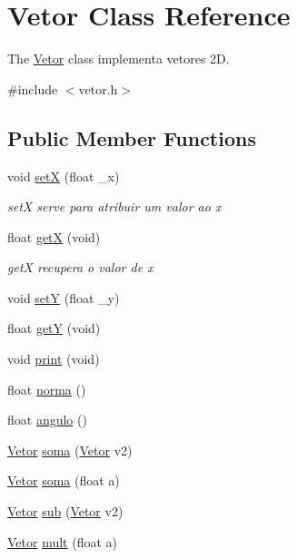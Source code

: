 \hypertarget{class_vetor}{}\section{Vetor Class Reference}
\label{class_vetor}


The \hyperlink{class_vetor}{Vetor} class implementa vetores 2D.  




{\ttfamily \#include $<$vetor.\+h$>$}

\subsection*{Public Member Functions}
\begin{DoxyCompactItemize}
\item 
void \hyperlink{class_vetor_a45e972d26987116ae8c89fefb09f5737}{setX} (float \+\_\+x)
\begin{DoxyCompactList}\small\item\em setX serve para atribuir um valor ao x \end{DoxyCompactList}\item 
float \hyperlink{class_vetor_a0b43068a518a1b9e42a2031aa6c41f0d}{getX} (void)
\begin{DoxyCompactList}\small\item\em getX recupera o valor de x \end{DoxyCompactList}\item 
void \hyperlink{class_vetor_a25c01341d46beebd3f4bf054d576772e}{setY} (float \+\_\+y)
\item 
float \hyperlink{class_vetor_aec52a87477cfeb998a1668abae852373}{getY} (void)
\item 
void \hyperlink{class_vetor_a253a700dc67db860e2ae8247f114990e}{print} (void)
\item 
float \hyperlink{class_vetor_a26e8c7db35c90a9313cfcb780a1ab324}{norma} ()
\item 
float \hyperlink{class_vetor_aa3508b558bf8b227edf517568634cc99}{angulo} ()
\item 
\hyperlink{class_vetor}{Vetor} \hyperlink{class_vetor_a71ecfbff082b0e1cb54a86ed57b75f2d}{soma} (\hyperlink{class_vetor}{Vetor} v2)
\item 
\hyperlink{class_vetor}{Vetor} \hyperlink{class_vetor_afe1abbd4330d535b22a155557b7a995f}{soma} (float a)
\item 
\hyperlink{class_vetor}{Vetor} \hyperlink{class_vetor_ad1a274942cf278d5535e80b5945ecf48}{sub} (\hyperlink{class_vetor}{Vetor} v2)
\item 
\hyperlink{class_vetor}{Vetor} \hyperlink{class_vetor_a6d248105b669c96b3a06fec82b3b55cc}{mult} (float a)
\end{DoxyCompactItemize}


